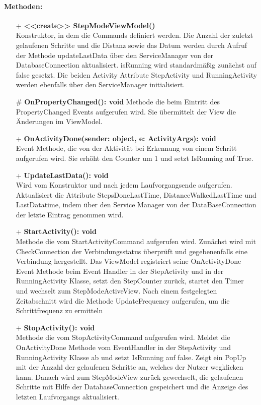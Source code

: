 \documentclass[a4paper,12pt]{article}
\begin{document}
\paragraph{Methoden:}
\begin{itemize}
	\item[+] \textbf{<<create>> StepModeViewModel()}\\ Konstruktor, in dem die Commands definiert werden. Die Anzahl der zuletzt gelaufenen Schritte und die Distanz sowie das Datum werden durch Aufruf der Methode updateLastData über den ServiceManager von der DatabaseConnection aktualisiert. isRunning wird standardmäßig zunächst auf false gesetzt. Die beiden Activity Attribute StepActivity und RunningActivity werden ebenfalls über den ServiceManager initialisiert.
	\item[\#] \textbf{OnPropertyChanged(): void} Methode die beim Eintritt des PropertyChanged Events aufgerufen wird. Sie übermittelt der View die Änderungen im ViewModel.
	\item[+] \textbf{OnActivityDone(sender: object, e: ActivityArgs): void} \\ Event Methode, die von der Aktivität bei Erkennung von einem Schritt aufgerufen wird. Sie erhöht den Counter um 1 und setzt IsRunning auf True. 
	\item[+] \textbf{UpdateLastData(): void} \\ Wird vom Konstruktor und nach jedem Laufvorgangsende aufgerufen. Aktualisiert die Attribute StepsDoneLastTime, DistanceWalkedLastTime und LastDatatime, indem über den Service Manager von der DataBaseConnection der letzte Eintrag genommen wird. 
	\item[+] \textbf{StartActivity(): void}\\ Methode die vom StartActivityCommand aufgerufen wird. Zunächst wird mit CheckConnection der Verbindungsstatus überprüft und gegebenenfalls eine Verbindung hergestellt. Das ViewModel registriert seine OnActivityDone Event Methode beim Event Handler in der StepActivity und in der RunningActivity Klasse, setzt den StepCounter zurück, startet den Timer und wechselt zum StepModeActiveView. Nach einem festgelegten Zeitabschnitt wird die Methode UpdateFrequency aufgerufen, um die Schrittfrequenz zu ermitteln
	\item[+] \textbf {StopActivity(): void}\\ Methode die vom StopActivityCommand aufgerufen wird. Meldet die OnActivityDone Methode vom EventHandler in der StepActivity und RunningActivity Klasse ab und setzt IsRunning auf false. Zeigt ein PopUp mit der Anzahl der gelaufenen Schritte an, welches der Nutzer wegklicken kann. Danach wird zum StepModeView zurück gewechselt, die gelaufenen Schritte mit Hilfe der DatabaseConnection gespeichert und die Anzeige des letzten Laufvorgangs aktualisiert.  

\end{itemize}
\end{document}
